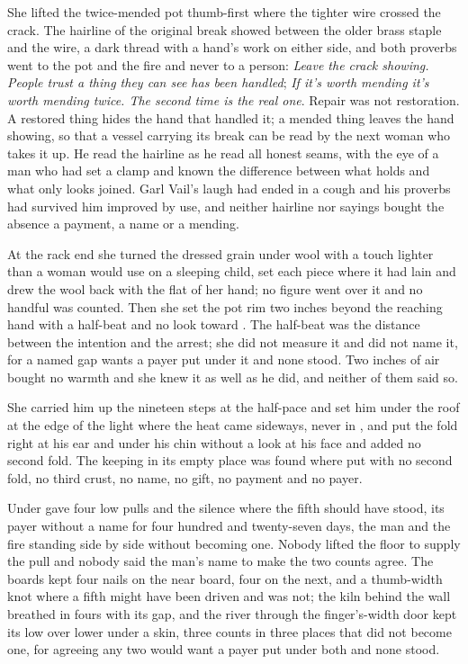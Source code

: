 She lifted the twice-mended pot thumb-first where the tighter wire crossed the crack. The hairline of the original break showed between the older brass staple and the wire, a dark thread with a hand's work on either side, and both proverbs went to the pot and the fire and never to a person: \emph{Leave the crack showing. People trust a thing they can see has been handled}; \emph{If it's worth mending it's worth mending twice. The second time is the real one}. Repair was not restoration. A restored thing hides the hand that handled it; a mended thing leaves the hand showing, so that a vessel carrying its break can be read by the next woman who takes it up. He read the hairline as he read all honest seams, with the eye of a man who had set a clamp and known the difference between what holds and what only looks joined. Garl Vail's laugh had ended in a cough and his proverbs had survived him improved by use, and neither hairline nor sayings bought the absence a payment, a name or a mending.

At the rack end she turned the dressed grain under wool with a touch lighter than a woman would use on a sleeping child, set each piece where it had lain and drew the wool back with the flat of her hand; no figure went over it and no handful was counted. Then she set the pot rim two inches beyond the reaching hand with a half-beat and no look toward . The half-beat was the distance between the intention and the arrest; she did not measure it and did not name it, for a named gap wants a payer put under it and none stood. Two inches of air bought no warmth and she knew it as well as he did, and neither of them said so.

She carried him up the nineteen steps at the half-pace and set him under the roof at the edge of the light where the heat came sideways, never in , and put the fold right at his ear and under his chin without a look at his face and added no second fold. The keeping in its empty place was found where put with no second fold, no third crust, no name, no gift, no payment and no payer.

Under   gave four low pulls and the silence where the fifth should have stood, its payer without a name for four hundred and twenty-seven days, the man and the fire standing side by side without becoming one. Nobody lifted the floor to supply the pull and nobody said the man's name to make the two counts agree. The boards kept four nails on the near board, four on the next, and a thumb-width knot where a fifth might have been driven and was not; the kiln behind the wall breathed in fours with its gap, and the river through the finger's-width door kept its low over lower under a skin, three counts in three places that did not become one, for agreeing any two would want a payer put under both and none stood.

